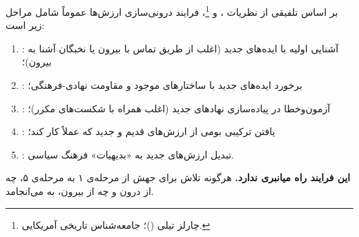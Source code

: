 \begin{tcolorbox}[mybox,
	title={مراحل درونی‌سازی ارزش‌های دموکراتیک}]
	بر اساس تلفیقی از نظریات
	، 
	و %
	\footnote{چارلز تیلی ()؛
		جامعه‌شناس تاریخی آمریکایی.}،
	فرایند درونی‌سازی ارزش‌ها عموماً شامل مراحل زیر است:
	
	\begin{enumerate}[label=\textbf{مرحله‌ی \arabic*:}, nosep, rightmargin=1em]
		\item {}: آشنایی اولیه با ایده‌های جدید (اغلب
		از طریق تماس با بیرون یا نخبگان آشنا به بیرون)؛
		\item {}: برخورد ایده‌های جدید با ساختارهای موجود
		و مقاومت نهادی-فرهنگی؛
		\item {}: آزمون‌وخطا در پیاده‌سازی نهادهای
		جدید (اغلب همراه با شکست‌های مکرر)؛
		\item {}: یافتن ترکیبی بومی از ارزش‌های
		قدیم و جدید که عملاً کار کند؛
		\item {}: تبدیل ارزش‌های جدید به «بدیهیات»
		فرهنگ سیاسی.
	\end{enumerate}
	
	\textbf{این فرایند راه میانبری ندارد.} هرگونه تلاش برای جهش از
	مرحله‌ی ۱ به مرحله‌ی ۵، چه از درون و چه از بیرون،
	به 
	می‌انجامد.
\end{tcolorbox}

